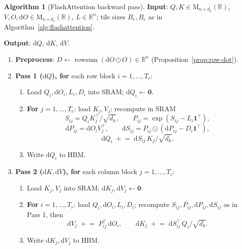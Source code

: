\documentclass[11pt]{amsart}
\theoremstyle{plain}
\theoremstyle{definition}
\newtheorem{algorithm}[theorem]{Algorithm}
\newcommand{\R}{\mathbb{R}}
\newcommand{\Mat}[2]{\mathrm{M}_{#1 \times #2}(\R)}
\DeclareMathOperator{\rowsum}{rowsum}
\begin{document}
\begin{algorithm}[FlashAttention backward pass]
\label{alg:flashattention-backward}
\textbf{Input}: $Q, K \in \Mat{n}{d_k}$, $V, O, \mathrm{d}O \in \Mat{n}{d_v}$,
$L \in \R^n$; tile sizes $B_r, B_c$ as in
Algorithm~\ref{alg:flashattention}.

\textbf{Output}: $\mathrm{d}Q$, $\mathrm{d}K$, $\mathrm{d}V$.

\begin{enumerate}
    \item \textbf{Preprocess}: $D \leftarrow \rowsum(\mathrm{d}O \odot O)
    \in \R^n$ \quad (Proposition~\ref{prop:row-dot}).
    \item \textbf{Pass 1 ($\mathrm{d}Q$), for} each row block $i = 1, \ldots, T_r$:
    \begin{enumerate}
        \item Load $Q_i, \mathrm{d}O_i, L_i, D_i$ into SRAM;
        $\mathrm{d}Q_i \leftarrow \mathbf{0}$.
        \item \textbf{For} $j = 1, \ldots, T_c$: load $K_j, V_j$;
        recompute in SRAM
        \[
            S_{ij} = Q_i K_j^\top/\sqrt{d_k}, \qquad
            P_{ij} = \exp(S_{ij} - L_i \mathbf{1}^\top),
        \]
        \[
            \mathrm{d}P_{ij} = \mathrm{d}O_i V_j^\top, \qquad
            \mathrm{d}S_{ij} = P_{ij} \odot
              (\mathrm{d}P_{ij} - D_i \mathbf{1}^\top),
        \]
        \[
            \mathrm{d}Q_i \;\mathrel{+}=\;
              \mathrm{d}S_{ij}\, K_j/\sqrt{d_k}.
        \]
        \item Write $\mathrm{d}Q_i$ to HBM.
    \end{enumerate}
    \item \textbf{Pass 2 ($\mathrm{d}K, \mathrm{d}V$), for} each column
    block $j = 1, \ldots, T_c$:
    \begin{enumerate}
        \item Load $K_j, V_j$ into SRAM;
        $\mathrm{d}K_j, \mathrm{d}V_j \leftarrow \mathbf{0}$.
        \item \textbf{For} $i = 1, \ldots, T_r$: load
        $Q_i, \mathrm{d}O_i, L_i, D_i$; recompute $S_{ij}, P_{ij},
        \mathrm{d}P_{ij}, \mathrm{d}S_{ij}$ as in Pass 1, then
        \[
            \mathrm{d}V_j \;\mathrel{+}=\; P_{ij}^\top\, \mathrm{d}O_i,
            \qquad
            \mathrm{d}K_j \;\mathrel{+}=\;
              \mathrm{d}S_{ij}^\top\, Q_i/\sqrt{d_k}.
        \]
        \item Write $\mathrm{d}K_j, \mathrm{d}V_j$ to HBM.
    \end{enumerate}
\end{enumerate}
\end{algorithm}
\end{document}
